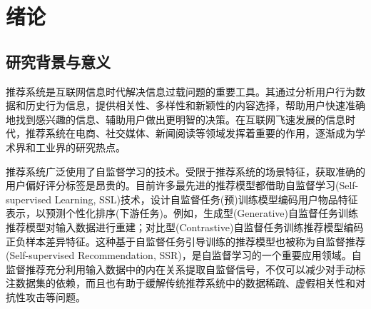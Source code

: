 
\chapter{绪论}
\label{cha:intro}

\section{研究背景与意义}\label{sec:general intro}
推荐系统\cite{rs}是互联网信息时代解决信息过载问题的重要工具。其通过分析用户行为数据和历史行为信息，提供相关性、多样性和新颖性的内容选择，帮助用户快速准确地找到感兴趣的信息、辅助用户做出更明智的决策。在互联网飞速发展的信息时代，推荐系统在电商、社交媒体、新闻阅读等领域发挥着重要的作用，逐渐成为学术界和工业界的研究热点\cite{Steffen:2009:UAI,Ai:2018:SIGIR,Ding:2020:NIPS}。


推荐系统广泛使用了自监督学习的技术\cite{SSR:2023:TKDE,Xiangnan:2020:SIGIR,Wang:2019:SIGIR,shuai2022review,guo2022miss,tao2022self,yao2021self,xia2021self,liu2021contrastive,yuan2021improving,wu2020ptum,ma2020disentangled,10.1145/3459637.3482426,10.1145/3404835.3462862,self:aug}。受限于推荐系统的场景特征，获取准确的用户偏好评分标签是昂贵的。目前许多最先进的推荐模型都借助自监督学习(Self-supervised Learning, SSL)\cite{tong2023emp,Liu:2021:TKDE,Chen:2020:NIPS,BYOL:2020:NIPS,wu:2023:TKDE,gsl:2023:TKDE}技术，设计自监督任务(预)训练模型编码用户物品特征表示，以预测个性化排序(下游任务)。例如，生成型(Generative)自监督任务训练推荐模型对输入数据进行重建\cite{sun2019bert4rec,geng2022recommendation,zhang:sigir}；对比型(Contrastive)自监督任务训练推荐模型编码正负样本差异特征\cite{Steffen:2009:UAI,Jingtao:2019:IJCAI,Xiangnan:2020:SIGIR,Wang:2019:SIGIR,shuai2022review,lightgcl:2023:ICLR,wu:2023:TKDE}。这种基于自监督任务引导训练的推荐模型也被称为自监督推荐\cite{SSR:2023:TKDE}(Self-supervised Recommendation, SSR)，是自监督学习的一个重要应用领域。自监督推荐充分利用输入数据中的内在关系提取自监督信号，不仅可以减少对手动标注数据集的依赖，而且也有助于缓解传统推荐系统中的数据稀疏、虚假相关性和对抗性攻击等问题\cite{SSR:2023:TKDE,Liu:2021:TKDE}。

